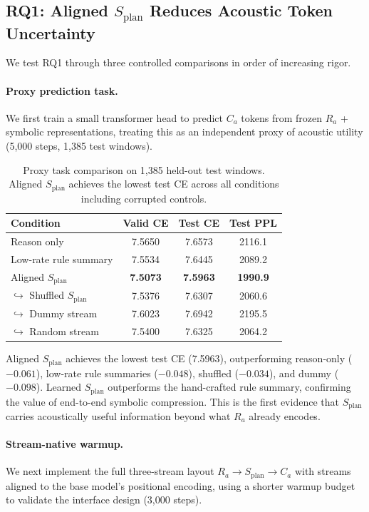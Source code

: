\documentclass[11pt]{article}
\newcommand{\splan}{$S_{\mathrm{plan}}$}
\newcommand{\splanmath}{S_{\mathrm{plan}}}
\newcommand{\Ramath}{R_a}
\newcommand{\Camath}{C_a}
\begin{document}
\subsection{RQ1: Aligned \splan{} Reduces Acoustic Token Uncertainty}
\label{sec:rq1}

We test RQ1 through three controlled comparisons in order of increasing rigor.

\paragraph{Proxy prediction task.}
We first train a small transformer head to predict $\Camath$ tokens from frozen $\Ramath$ +
symbolic representations, treating this as an independent proxy of acoustic utility
(5,000 steps, 1,385 test windows).

\begin{table}[h]
\centering
\small
\begin{tabular}{lccc}
\toprule
Condition & Valid CE & Test CE & Test PPL \\
\midrule
Reason only            & 7.5650 & 7.6573 & 2116.1 \\
Low-rate rule summary  & 7.5534 & 7.6445 & 2089.2 \\
Aligned \splan{}       & \textbf{7.5073} & \textbf{7.5963} & \textbf{1990.9} \\
\quad$\hookrightarrow$ Shuffled \splan{}  & 7.5376 & 7.6307 & 2060.6 \\
\quad$\hookrightarrow$ Dummy stream       & 7.6023 & 7.6942 & 2195.5 \\
\quad$\hookrightarrow$ Random stream      & 7.5400 & 7.6325 & 2064.2 \\
\bottomrule
\end{tabular}
\caption{Proxy task comparison on 1,385 held-out test windows.  Aligned \splan{}
  achieves the lowest test CE across all conditions including corrupted controls.}
\label{tab:proxy}
\end{table}

Aligned \splan{} achieves the lowest test CE (7.5963), outperforming reason-only
($-0.061$), low-rate rule summaries ($-0.048$), shuffled ($-0.034$), and dummy ($-0.098$).
Learned \splan{} outperforms the hand-crafted rule summary, confirming the value of
end-to-end symbolic compression.  This is the first evidence that \splan{} carries
acoustically useful information beyond what $\Ramath$ already encodes.

\paragraph{Stream-native warmup.}
We next implement the full three-stream layout $\Ramath \to \splanmath \to \Camath$
with streams aligned to the base model's positional encoding, using a shorter warmup
budget to validate the interface design (3,000 steps).
\end{document}
